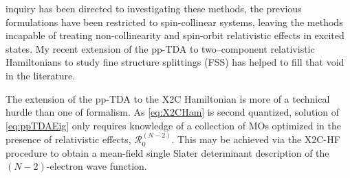 inquiry has been directed to investigating these methods, the previous
formulations have been restricted to spin-collinear systems, leaving the methods
incapable of treating non-collinearity and spin-orbit relativistic effects in
excited states.  My recent extension of the pp-TDA to two--component
relativistic Hamiltonians\cite{DBWY16_Accepted1} to study fine structure
splittings (FSS) has helped to fill that void in the literature.


The extension of the pp-TDA to the X2C Hamiltonian is more of a technical hurdle
than one of formalism. As \cref{eq:X2CHam} is second quantized, solution of
\cref{eq:ppTDAEig} only requires knowledge of a collection of MOs optimized in
the presence of relativistic effects,
$\mathcal{R}_0^{(N-2)}$. This may be achieved via the X2C-HF procedure to obtain
a mean-field single Slater determinant description of the $(N-2)$-electron wave
function.

